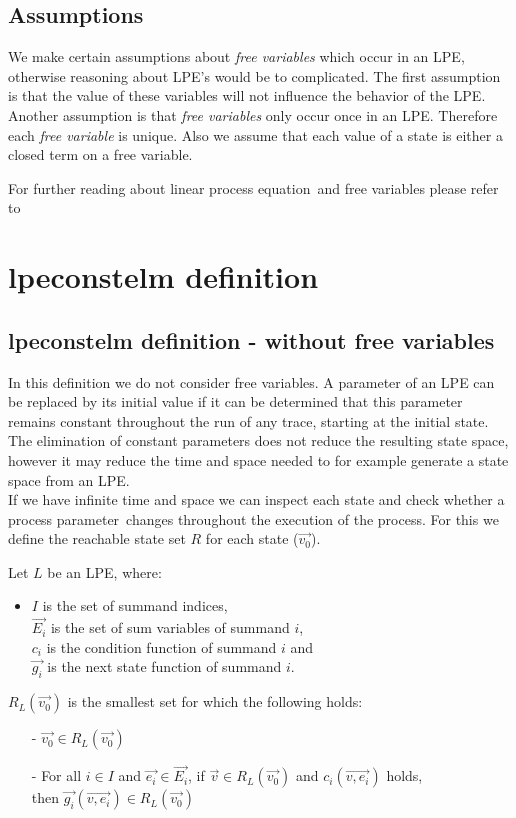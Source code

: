\index{}\documentclass[a4paper,10pt]{article}
\theoremstyle{plain}
\theoremstyle{definition}
\newcommand{\lpe}{linear process equation}
\newcommand{\ovr}{\overrightarrow}
\newcommand{\pp}{process parameter}
\newcommand{\ti}{\textit}
\begin{document}
\subsection{Assumptions}
We make certain assumptions about \ti{free variables} which occur in an LPE, otherwise reasoning about LPE's would be to complicated. The first assumption is that the value of these variables will not influence the behavior of the LPE. Another assumption is that \ti{free variables} only occur once in an LPE. Therefore each \ti{free variable} is unique.
Also we assume that each value of a state is either a closed term on a free variable. 
 
For further reading about \lpe\ and free variables please refer to \cite{LPEfreevar} 

\section{lpeconstelm definition}\label{subsec:lpedef}
\subsection{lpeconstelm definition - without free variables}

In this definition we do not consider free variables.
A parameter of an LPE can be replaced by its initial value if it can be determined that this parameter remains constant throughout the run of any trace, starting at the initial state. The elimination of constant parameters does not reduce the resulting state space, however it may reduce the time and space needed to for example generate a state space from an LPE. \\
If we have infinite time and space we can inspect each state and check whether a \pp\ changes throughout the execution of the process. For this we define the reachable state set $R$ for each state ($\ovr{v_0}$). 

\begin{defn}\label{def:lpe} Let $L$ be an LPE, where: \\ 
\begin{itemize}
\item $I$ is the set of summand indices, \\ $\ovr{E_i}$ is the set of sum variables of summand $i$, \\ $c_i$ is the condition function of summand $i$ and \\ $\ovr{g_i}$ is the next state function of summand $i$.
\end{itemize}

$R_L(\ovr{v_0})$ is the smallest set for which the following holds:
  \begin{itemize}
    \item[-] $\ovr{v_0} \in R_L(\ovr{v_0})$
    \item[-] For all $i \in I$ and $\ovr{e_i} \in \ovr{E_i}$, if $\ovr{v} \in R_L(\ovr{v_0})$ and $c_i(\ovr{v, e_i})$ holds, \\ then $\ovr{g_i}(\ovr{v, e_i}) \in R_L(\ovr{v_0})$ \\
   \end{itemize}
\end{defn}
\end{document}
